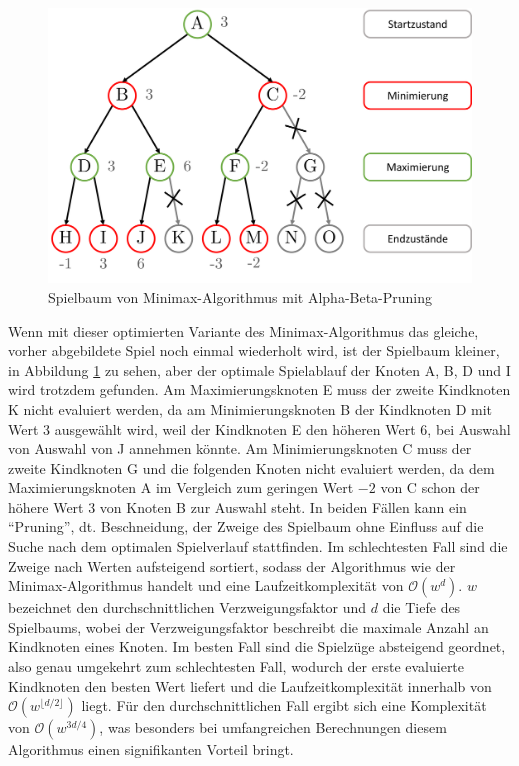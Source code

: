 \begin{figure}[!ht]
    \centering
    \includegraphics[width=\textwidth]{res/pictures/minimax-tree-with-a-b-pruning.pdf}
    \caption{Spielbaum von Minimax-Algorithmus mit Alpha-Beta-Pruning}
    \label{fig:minimax-a-b-tree}
    \vspace*{-0.1cm}
\end{figure}

Wenn mit dieser optimierten Variante des Minimax-Algorithmus das gleiche, vorher abgebildete Spiel noch einmal wiederholt wird, ist der Spielbaum kleiner, in Abbildung \ref{fig:minimax-a-b-tree} zu sehen, aber der optimale Spielablauf der Knoten A, B, D und I wird trotzdem gefunden. Am Maximierungsknoten E muss der zweite Kindknoten K nicht evaluiert werden, da am Minimierungsknoten B der Kindknoten D mit Wert 3 ausgewählt wird, weil der Kindknoten E den höheren Wert 6, bei Auswahl von Auswahl von J annehmen könnte. Am Minimierungsknoten C muss der zweite Kindknoten G und die folgenden Knoten nicht evaluiert werden, da dem Maximierungsknoten A im Vergleich zum geringen Wert $-2$ von C schon der höhere Wert 3 von Knoten B zur Auswahl steht. In beiden Fällen kann ein \enquote{Pruning}, dt. Beschneidung, der Zweige des Spielbaum ohne Einfluss auf die Suche nach dem optimalen Spielverlauf stattfinden. Im schlechtesten Fall sind die Zweige nach Werten aufsteigend sortiert, sodass der Algorithmus wie der Minimax-Algorithmus handelt und eine Laufzeitkomplexität von $\mathcal{O}(w^{d})$. $w$ bezeichnet den durchschnittlichen Verzweigungsfaktor und $d$ die Tiefe des Spielbaums, wobei der Verzweigungsfaktor beschreibt die maximale Anzahl an Kindknoten eines Knoten. Im besten Fall sind die Spielzüge absteigend geordnet, also genau umgekehrt zum schlechtesten Fall, wodurch der erste evaluierte Kindknoten den besten Wert liefert und die Laufzeitkomplexität innerhalb von $\mathcal{O}\left(w^{\lfloor d/2\rfloor}\right)$ liegt. Für den durchschnittlichen Fall ergibt sich eine Komplexität von $\mathcal{O}\left(w^{3d/4}\right)$, was besonders bei umfangreichen Berechnungen diesem Algorithmus einen signifikanten Vorteil bringt. \cite[S. 3 ff.]{2017.AlphaBeta}

